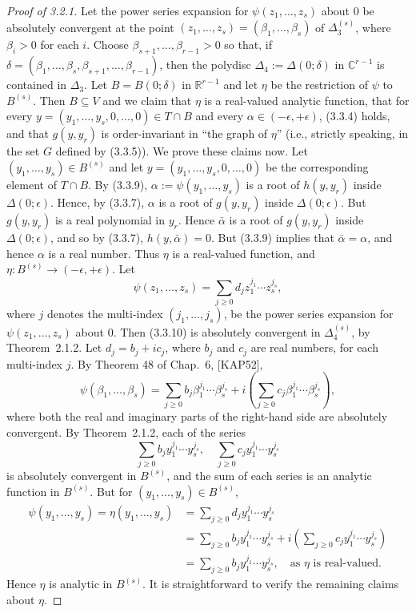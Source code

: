 \documentclass[11pt]{article}
\theoremstyle{plain}
\theoremstyle{definition}
\newcommand{\R}{\mathbb{R}}
\newcommand{\C}{\mathbb{C}}
\begin{document}
\begin{proof}[Proof of 3.2.1]
Let the power series expansion for $\psi(z_1, \ldots, z_s)$ about $0$
be absolutely convergent at the point
$(z_1, \ldots, z_s) = (\beta_1, \ldots, \beta_s)$ of
$\Delta_3^{(s)}$, where $\beta_i > 0$ for each $i$. Choose
$\beta_{s+1}, \ldots, \beta_{r-1} > 0$ so that, if
$\delta = (\beta_1, \ldots, \beta_s, \beta_{s+1}, \ldots, \beta_{r-1})$,
then the polydisc $\Delta_4 := \Delta(0; \delta)$ in $\C^{r-1}$ is
contained in $\Delta_3$. Let $B = B(0; \delta)$ in $\R^{r-1}$ and let
$\eta$ be the restriction of $\psi$ to $B^{(s)}$. Then $B \subseteq V$
and we claim that $\eta$ is a real-valued analytic function, that for
every $y = (y_1, \ldots, y_s, 0, \ldots, 0) \in T \cap B$ and every
$\alpha \in (-\epsilon, +\epsilon)$, (3.3.4) holds, and that
$g(y, y_r)$ is order-invariant in ``the graph of $\eta$'' (i.e.,
strictly speaking, in the set $G$ defined by (3.3.5)). We prove these
claims now. Let $(y_1, \ldots, y_s) \in B^{(s)}$ and let
$y = (y_1, \ldots, y_s, 0, \ldots, 0)$ be the corresponding element of
$T \cap B$. By (3.3.9), $\alpha := \psi(y_1, \ldots, y_s)$ is a root
of $h(y, y_r)$ inside $\Delta(0; \epsilon)$. Hence, by (3.3.7),
$\alpha$ is a root of $g(y, y_r)$ inside $\Delta(0; \epsilon)$. But
$g(y, y_r)$ is a real polynomial in $y_r$. Hence $\bar{\alpha}$ is a
root of $g(y, y_r)$ inside $\Delta(0; \epsilon)$, and so by (3.3.7),
$h(y, \bar{\alpha}) = 0$. But (3.3.9) implies that $\bar{\alpha} =
\alpha$, and hence $\alpha$ is a real number. Thus $\eta$ is a
real-valued function, and $\eta : B^{(s)} \to (-\epsilon, +\epsilon)$.
Let
\begin{equation}
\psi(z_1, \ldots, z_s) = \sum_{j \ge 0} d_j z_1^{j_1} \cdots z_s^{j_s}, \tag{3.3.10}
\end{equation}
where $j$ denotes the multi-index $(j_1, \ldots, j_s)$, be the power
series expansion for $\psi(z_1, \ldots, z_s)$ about $0$. Then
(3.3.10) is absolutely convergent in $\Delta_4^{(s)}$, by
Theorem~2.1.2. Let $d_j = b_j + i c_j$, where $b_j$ and $c_j$ are
real numbers, for each multi-index $j$. By Theorem 48 of Chap.~6,
[KAP52],
\[
\psi(\beta_1, \ldots, \beta_s) = \sum_{j \ge 0} b_j \beta_1^{j_1} \cdots \beta_s^{j_s}
+ i \left( \sum_{j \ge 0} c_j \beta_1^{j_1} \cdots \beta_s^{j_s} \right),
\]
where both the real and imaginary parts of the right-hand side are
absolutely convergent. By Theorem~2.1.2, each of the series
\[
\sum_{j \ge 0} b_j y_1^{j_1} \cdots y_s^{j_s}, \quad
\sum_{j \ge 0} c_j y_1^{j_1} \cdots y_s^{j_s}
\]
is absolutely convergent in $B^{(s)}$, and the sum of each series is
an analytic function in $B^{(s)}$. But for
$(y_1, \ldots, y_s) \in B^{(s)}$,
\[
\begin{aligned}
\psi(y_1, \ldots, y_s) = \eta(y_1, \ldots, y_s)
&= \sum_{j \ge 0} d_j y_1^{j_1} \cdots y_s^{j_s} \\
&= \sum_{j \ge 0} b_j y_1^{j_1} \cdots y_s^{j_s}
+ i \left( \sum_{j \ge 0} c_j y_1^{j_1} \cdots y_s^{j_s} \right) \\
&= \sum_{j \ge 0} b_j y_1^{j_1} \cdots y_s^{j_s}, \quad
\text{as $\eta$ is real-valued.}
\end{aligned}
\]
Hence $\eta$ is analytic in $B^{(s)}$. It is straightforward to verify
the remaining claims about $\eta$.


\end{proof}
\end{document}
